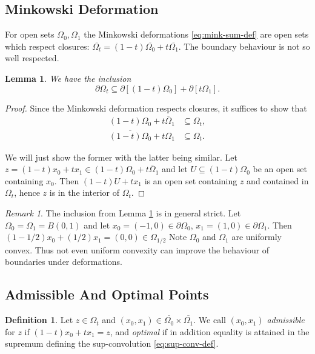 \documentclass[12pt]{amsart}
\newtheorem{lem}[thm]{Lemma}
\newenvironment{pf}{\begin{proof}}{\end{proof}}
\theoremstyle{definition}
\newtheorem{defn}[thm]{Definition}
\theoremstyle{remark}
\newtheorem{rem}[thm]{Remark}
\begin{document}
\subsection{Minkowski Deformation}
\label{sec:orge2d344d} For open sets $\Omega_0,\Omega_1$ the Minkowski deformations \eqref{eq:mink-sum-def} are open sets which respect closures:
\(\overline{\Omega_t} = (1-t) \overline{\Omega_0} + t \overline{\Omega_1}\). The boundary behaviour is not so well respected.
\begin{lem}
  \label{org44df74f} We have the inclusion
  \[ \partial \Omega_t \subseteq \partial [(1-t)\Omega_0] + \partial [t\Omega_1].
  \]
\end{lem}
\begin{pf} Since the Minkowski deformation respects closures, it suffices to
show that
  \begin{align*} (1-t)\Omega_0 + \overline{t\Omega_1} &\subseteq \Omega_t, \\ \overline{(1-t)\Omega_0} +
t\Omega_1 &\subseteq \Omega_t.
  \end{align*}

We will just show the former with the latter being similar.  Let \(z = (1-t)x_0
+ t x_1 \in (1-t)\Omega_0 + \overline{t\Omega_1}\) and let \(U \subseteq (1-t)\Omega_0\) be an open set
containing \(x_0\). Then \((1-t)U + t x_1\) is an open set
containing \(z\) and contained in \(\Omega_t\), hence \(z\) is in the interior of \(\Omega_t\).
\end{pf}



\begin{rem}
The inclusion from Lemma \ref{org44df74f} is in general strict. Let \(\Omega_0 = \Omega_1 = B(0,1)\) and let \(x_0 = (-1, 0) \in \partial
\Omega_0\), \(x_1 = (1, 0) \in \partial \Omega_1\). Then \((1-1/2)x_0 + (1/2)x_1 = (0, 0) \in
\Omega_{1/2}\)
 Note \(\Omega_0\) and \(\Omega_1\) are uniformly
convex. Thus not even uniform convexity can improve the behaviour of boundaries under  deformations.
\end{rem}
\subsection{Admissible And Optimal Points}
\label{sec:org81a28c0}
\begin{defn}
  \label{orgf87f94b} Let \(z \in \Omega_t\) and \((x_0, x_1) \in \overline{\Omega_0} \times \overline{\Omega_1}\). We call \((x_0, x_1)\) \emph{admissible} for \(z\) if \((1-t)x_0 + t x_1 = z\), and \emph{optimal} if in addition equality is attained in the supremum defining the sup-convolution \eqref{eq:sup-conv-def}.
\end{defn}
\end{document}
